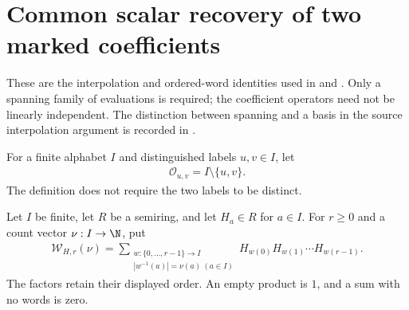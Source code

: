 \section{Common scalar recovery of two marked coefficients}

These are the interpolation and ordered-word identities used in
\cite[Lemma~4.2]{Arad2013AreaLaw} and
\cite[Proposition~5.7]{Arad2016RigorousRG}.
Only a spanning family of evaluations is required; the coefficient operators
need not be linearly independent. The distinction between spanning and a
basis in the source interpolation argument is recorded in
\cite{gap:aklv13_interpolation_and_word_count}.

\begin{definition}
    \label{def:two_marker_ordinary_labels}
    For a finite alphabet $I$ and distinguished labels $u,v\in I$, let
    \begin{align}
        \mathcal O_{u,v}=I\setminus\{u,v\}.
        \label{eq:two_marker_ordinary_labels}
    \end{align}
    The definition does not require the two labels to be distinct.
\end{definition}

\begin{definition}
    \label{def:full_frequency_word_coefficient}
    Let $I$ be finite, let $R$ be a semiring, and let $H_a\in R$ for $a\in I$.
    For $r\ge0$ and a count vector $\nu:I\to\N$, put
    \begin{align}
        \mathcal W_{H,r}(\nu)=
        \sum_{\substack{w:\{0,\ldots,r-1\}\to I \\
                |w^{-1}(a)|=\nu(a)\ (a\in I)}}
        H_{w(0)}H_{w(1)}\cdots H_{w(r-1)}.
        \label{eq:full_frequency_word_coefficient}
    \end{align}
    The factors retain their displayed order. An empty product is $1$, and a
    sum with no words is zero.
\end{definition}

